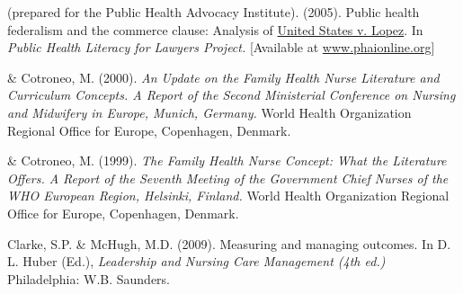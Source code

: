 \documentclass[10pt,]{article}
\begin{document}
{{{{{{{{{{{{{{\begin{hangparas}{.25in}{1}
\end{hangparas}

\vspace{4mm}

\begin{hangparas}{.25in}{1}

 (prepared for the Public Health Advocacy Institute). (2005). Public health federalism and the commerce clause: Analysis of {\underline {United States v. Lopez}}. In {\textit {Public Health Literacy for Lawyers Project.}} [Available at \href{http://www.phaionline.org}{\ttfamily www.phaionline.org}]

\end{hangparas}

\vspace{4mm}

\begin{hangparas}{.25in}{1}

 \& Cotroneo, M. (2000). {\textit {An Update on the Family Health Nurse Literature and Curriculum Concepts. A Report of the Second Ministerial Conference on Nursing and Midwifery in Europe, Munich, Germany.}} World Health Organization Regional Office for Europe, Copenhagen, Denmark.

\end{hangparas}

\vspace{4mm}

\begin{hangparas}{.25in}{1}

 \& Cotroneo, M. (1999). {\textit {The Family Health Nurse Concept: What the Literature Offers. A Report of the Seventh Meeting of the Government Chief Nurses of the WHO European Region, Helsinki, Finland.}} World Health Organization Regional Office for Europe, Copenhagen, Denmark.

\end{hangparas}

\vspace{4mm}


\begin{hangparas}{.25in}{1}

\*Clarke, S.P. \& McHugh, M.D. (2009). Measuring and managing outcomes. In D. L. Huber (Ed.), {\textit {Leadership and Nursing Care Management (4th ed.)}} Philadelphia: W.B. Saunders.


\end{hangparas}}}}}}}}}}}}}}}
\end{document}
